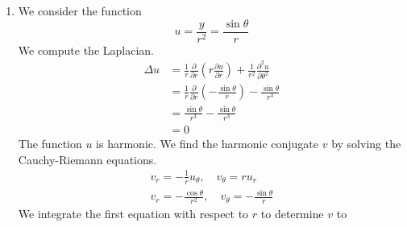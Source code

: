 {\begin{Solution}
\begin{enumerate}
    The function $u$ is harmonic.  We find the harmonic conjugate $v$ by 
    solving the Cauchy-Riemann equations.
    \begin{gather*}
      v_r = - \frac{1}{r} u_\theta, \quad v_\theta = r u_r 
      \\
      v_r = n r^{n-1} \sin(n \theta), \quad
      v_\theta = n r^n \cos(n \theta)
    \end{gather*}
    We integrate the first equation with respect to $r$ to determine $v$ to 
    within the constant of integration $g(\theta)$.
    \[
    v = r^n \sin(n \theta) + g(\theta)
    \]
    We differentiate this expression with respect to $\theta$.
    \[
    v_\theta = n r^n \cos(n \theta) + g'(\theta)
    \]
    We compare this to the second Cauchy-Riemann equation to see that
    $g'(\theta) = 0$.  Thus $g(\theta) = c$.  We have determined the harmonic conjugate.
    \[
    \boxed{
      v = r^n \sin(n \theta) + c
      }
    \]
    The corresponding analytic function is 
    \[
    f(z) = r^n \cos(n \theta) + \imath r^n \sin(n \theta) + \imath c
    \]
    On the positive real axis, ($\theta = 0$), the function has the value
    \[
    f(z = r) = r^n + \imath c
    \]
    We use analytic continuation to determine the function in the 
    complex plane.
    \[
    \boxed{
      f(z) = z^n
      }
    \]
  \item
    We consider the function
    \[
    u = \frac{y}{r^2} = \frac{\sin \theta}{r}
    \]
    We compute the Laplacian.
    \begin{align*}
      \Delta u &= \frac{1}{r} \frac{\partial}{\partial r} \left( r \frac{\partial u}{\partial r} \right)
      + \frac{1}{r^2} \frac{\partial^2 u}{\partial \theta^2} \\
      &= \frac{1}{r} \frac{\partial}{\partial r} \left( - \frac{\sin \theta}{r} \right)
      - \frac{\sin \theta}{r^3} 
      \\
      &= \frac{\sin \theta}{r^3} - \frac{\sin \theta}{r^3} 
      \\
      &= 0
    \end{align*}
    The function $u$ is harmonic.  We find the harmonic conjugate $v$ by 
    solving the Cauchy-Riemann equations.
    \begin{gather*}
      v_r = - \frac{1}{r} u_\theta, \quad v_\theta = r u_r 
      \\
      v_r = - \frac{\cos \theta}{r^2}, \quad
      v_\theta = - \frac{\sin \theta}{r}
    \end{gather*}
    We integrate the first equation with respect to $r$ to determine $v$ to 

\end{enumerate}
\end{Solution}}
